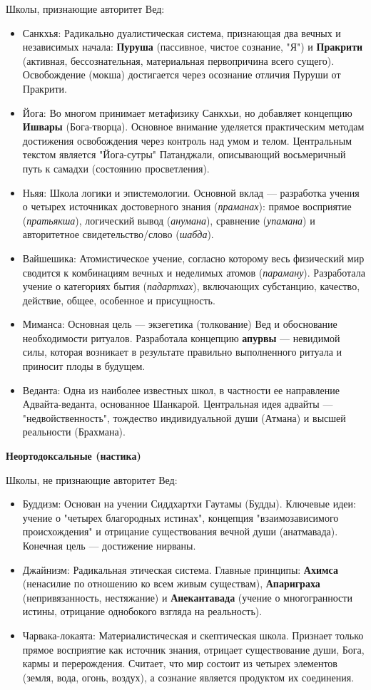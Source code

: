\documentclass[12pt,a4paper]{article}
\begin{document}
	Школы, признающие авторитет Вед:
	\begin{itemize}
		\item Санкхья: Радикально дуалистическая система, признающая два вечных и независимых начала: \textbf{Пуруша} (пассивное, чистое сознание, "Я") и \textbf{Пракрити} (активная, бессознательная, материальная первопричина всего сущего). Освобождение (мокша) достигается через осознание отличия Пуруши от Пракрити.
		\item Йога: Во многом принимает метафизику Санкхьи, но добавляет концепцию \textbf{Ишвары} (Бога-творца). Основное внимание уделяется практическим методам достижения освобождения через контроль над умом и телом. Центральным текстом является "Йога-сутры" Патанджали, описывающий восьмеричный путь к самадхи (состоянию просветления).
		\item Ньяя: Школа логики и эпистемологии. Основной вклад --- разработка учения о четырех источниках достоверного знания (\textit{праманах}): прямое восприятие (\textit{пратьякша}), логический вывод (\textit{анумана}), сравнение (\textit{упамана}) и авторитетное свидетельство/слово (\textit{шабда}).
		\item Вайшешика: Атомистическое учение, согласно которому весь физический мир сводится к комбинациям вечных и неделимых атомов (\textit{параману}). Разработала учение о категориях бытия (\textit{падартхах}), включающих субстанцию, качество, действие, общее, особенное и присущность.
		\item Миманса: Основная цель --- экзегетика (толкование) Вед и обоснование необходимости ритуалов. Разработала концепцию \textbf{апурвы} --- невидимой силы, которая возникает в результате правильно выполненного ритуала и приносит плоды в будущем.
		\item Веданта: Одна из наиболее известных школ, в частности ее направление Адвайта-веданта, основанное Шанкарой. Центральная идея адвайты --- "недвойственность", тождество индивидуальной души (Атмана) и высшей реальности (Брахмана).
	\end{itemize}
	
	\textbf{Неортодоксальные (настика)}
	
	Школы, не признающие авторитет Вед:
	\begin{itemize}
		\item Буддизм: Основан на учении Сиддхартхи Гаутамы (Будды). Ключевые идеи: учение о "четырех благородных истинах", концепция "взаимозависимого происхождения" и отрицание существования вечной души (анатмавада). Конечная цель --- достижение нирваны.
		\item Джайнизм: Радикальная этическая система. Главные принципы: \textbf{Ахимса} (ненасилие по отношению ко всем живым существам), \textbf{Апариграха} (непривязанность, нестяжание) и \textbf{Анекантавада} (учение о многогранности истины, отрицание однобокого взгляда на реальность).
		\item Чарвака-локаята: Материалистическая и скептическая школа. Признает только прямое восприятие как источник знания, отрицает существование души, Бога, кармы и перерождения. Считает, что мир состоит из четырех элементов (земля, вода, огонь, воздух), а сознание является продуктом их соединения.
	\end{itemize}
	
\end{document}
